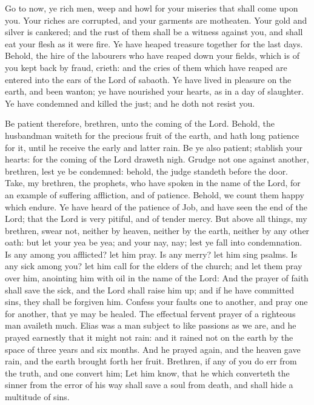  Go to now, ye rich men, weep and howl for your miseries
that shall come upon you.  Your riches are corrupted, and
your garments are motheaten.  Your gold and silver is
cankered; and the rust of them shall be a witness against you, and shall
eat your flesh as it were fire. Ye have heaped treasure together for the
last days.  Behold, the hire of the labourers who have
reaped down your fields, which is of you kept back by fraud, crieth: and
the cries of them which have reaped are entered into the ears of the
Lord of sabaoth.  Ye have lived in pleasure on the earth,
and been wanton; ye have nourished your hearts, as in a day of
slaughter.  Ye have condemned and killed the just; and he
doth not resist you.

 Be patient therefore, brethren, unto the coming of the
Lord. Behold, the husbandman waiteth for the precious fruit of the
earth, and hath long patience for it, until he receive the early and
latter rain.  Be ye also patient; stablish your hearts:
for the coming of the Lord draweth nigh.  Grudge not one
against another, brethren, lest ye be condemned: behold, the judge
standeth before the door.  Take, my brethren, the
prophets, who have spoken in the name of the Lord, for an example of
suffering affliction, and of patience.  Behold, we count
them happy which endure. Ye have heard of the patience of Job, and have
seen the end of the Lord; that the Lord is very pitiful, and of tender
mercy.  But above all things, my brethren, swear not,
neither by heaven, neither by the earth, neither by any other oath: but
let your yea be yea; and your nay, nay; lest ye fall into condemnation.
 Is any among you afflicted? let him pray. Is any merry?
let him sing psalms.  Is any sick among you? let him call
for the elders of the church; and let them pray over him, anointing him
with oil in the name of the Lord:  And the prayer of
faith shall save the sick, and the Lord shall raise him up; and if he
have committed sins, they shall be forgiven him.  Confess
your faults one to another, and pray one for another, that ye may be
healed. The effectual fervent prayer of a righteous man availeth much.
 Elias was a man subject to like passions as we are, and
he prayed earnestly that it might not rain: and it rained not on the
earth by the space of three years and six months.  And he
prayed again, and the heaven gave rain, and the earth brought forth her
fruit.  Brethren, if any of you do err from the truth,
and one convert him;  Let him know, that he which
converteth the sinner from the error of his way shall save a soul from
death, and shall hide a multitude of sins.
